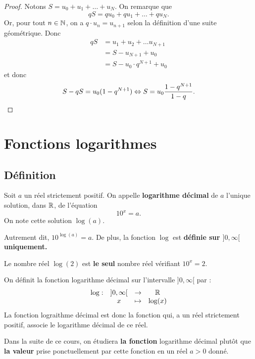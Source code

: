 \documentclass[a4paper, 12pt]{report}
\begin{document}
\begin{proof}
Notons $S = u_0 + u_1 + \dots + u_N$. On remarque que 
\[ qS = q u_0 + q u_1 + \dots + q u_N . \] 
Or, pour tout $n \in \mathbb{N}$, on a $q \cdot u_n = u_{n+1}$ selon la définition d'une suite géométrique. Donc
\begin{align*} 
qS & = u_1 + u_2 + \dots u_{N+1} \\
& = S - u_{N+1} + u_0 \\
& = S - u_0 \cdot q^{N+1} + u_0 
\end{align*}
et donc
\[ S - qS = u_0 (1-q^{N+1}) \Leftrightarrow S = u_0 \dfrac{1-q^{N+1}}{1-q} .\]
\end{proof}

\chapter{Fonctions logarithmes}

\section{Définition}

\begin{defn}
Soit $a$ un réel strictement positif. On appelle \textbf{logarithme décimal} de $a$ l'unique solution, dans $\mathbb{R}$, de l'équation 
\[ 10^x = a . \]
On note cette solution $\log(a)$.
\end{defn}

\begin{rmq}
Autrement dit, $10^{\log(a)} = a$. De plus, la fonction $\log$ est \textbf{définie sur $]0, \infty[$ uniquement.}
\end{rmq}

\begin{ex}
Le nombre réel $\log(2)$ est \textbf{le seul} nombre réel vérifiant $10^x = 2$.
\end{ex}

\begin{defn}
On définit la fonction logarithme décimal sur l'intervalle $]0, \infty[$ par :
\[ \begin{array}{c c c c} \log : & ]0, \infty[ & \to & \mathbb{R} \\ & x & \mapsto & \log(x) \end{array} \]
La fonction lograithme décimal est donc la fonction qui, a un réel strictement positif, associe le logarithme décimal de ce réel.
\end{defn}

\begin{rmq}
Dans la suite de ce cours, on étudiera \textbf{la fonction} logarithme décimal plutôt que \textbf{la valeur} prise ponctuellement par cette fonction en un réel $a >0$ donné.
\end{rmq}
\end{document}
